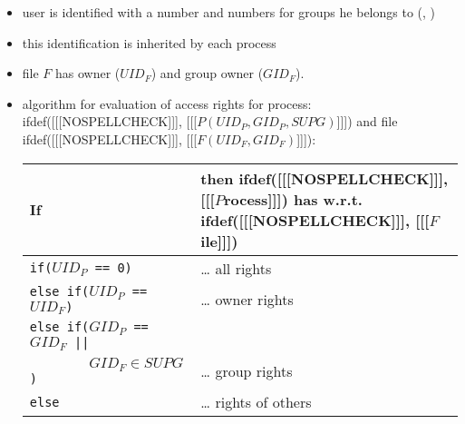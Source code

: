 
\begin{slide}
\setlength{\baselineskip}{0.9\baselineskip}
\begin{itemize}
\item user is identified with a  number and numbers for groups he
belongs to (, )
\item this identification is inherited by each process
\item file $F$ has owner ($UID_F$) and group owner ($GID_F$). 
\item algorithm for evaluation of access rights for process:
ifdef([[[NOSPELLCHECK]]], [[[$P(UID_P,GID_P,SUPG)$]]]) and file
ifdef([[[NOSPELLCHECK]]], [[[$F(UID_F,GID_F)$]]]):
\begin{tabular}{ll}
If & then ifdef([[[NOSPELLCHECK]]], [[[$P$rocess]]]) has w.r.t.
ifdef([[[NOSPELLCHECK]]], [[[$F$ile]]]) \\ 
\hline
\texttt{if($UID_P$ == 0)} & \dots{} all rights \\
\texttt{else if($UID_P$ == $UID_F$)} & \dots{} owner rights \\
\texttt{else if($GID_P$ == $GID_F$ ||} &\\
\texttt{~~~~~~~~$GID_F \in SUPG$)} & \dots{} group rights \\
\texttt{else} & \dots{} rights of others
\end{tabular}
\end{itemize}
\end{slide}

